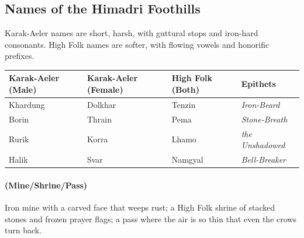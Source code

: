\subsection*{Names of the Himadri Foothills}
\label{sec:himadri-names}

Karak-Aeler names are short, harsh, with guttural stops and iron-hard consonants. High Folk names are softer, with flowing vowels and honorific prefixes.

\begin{longtable}{|p{}|p{}|p{}|p{}|}
\hline
\textbf{Karak-Aeler (Male)} & \textbf{Karak-Aeler (Female)} & \textbf{High Folk (Both)} & \textbf{Epithets} \\
\hline
Khardung & Dolkhar & Tenzin & \textit{Iron-Beard} \\
\hline
Borin & Thrain & Pema & \textit{Stone-Breath} \\
\hline
Rurik & Korra & Lhamo & \textit{the Unshadowed} \\
\hline
Halik & Svar & Namgyal & \textit{Bell-Breaker} \\
\hline
\end{longtable}

\paragraph*{(Mine/Shrine/Pass)} Iron mine with a carved face that weeps rust; a High Folk shrine of stacked stones and frozen prayer flags; a pass where the air is so thin that even the crows turn back.

